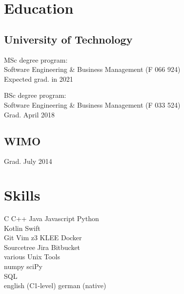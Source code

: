 \documentclass[]{resume}
\begin{document}
\begin{minipage}[t]{0.33\textwidth} 
\section{Education} 

	\subsection{University of Technology}
		MSc degree program: \\
		Software Engineering \& Business Management (F 066 924)\\
		Expected grad. in 2021
		\sectionsep

		BSc degree program: \\
		Software Engineering \& Business Management (F 033 524)\\
		Grad. April 2018
	\sectionsep

	\subsection{WIMO}
		Grad. July 2014
	\sectionsep

\section{Skills}
	C \textbullet{} C++ \textbullet{} Java \textbullet{} Javascript \textbullet{} Python \\ Kotlin \textbullet{} Swift \\ \sectionsep 
	Git \textbullet{} Vim \textbullet{} z3 \textbullet{} KLEE \textbullet{} Docker \\ Sourcetree \textbullet{} Jira \textbullet{} Bitbucket \\ 
	various Unix Tools \\ \sectionsep 
	numpy \textbullet{} sciPy \\ \sectionsep 
	SQL\\ \sectionsep 
	english (C1-level) \textbullet{} german (native)
	
\end{minipage}\quad %
\end{document}
